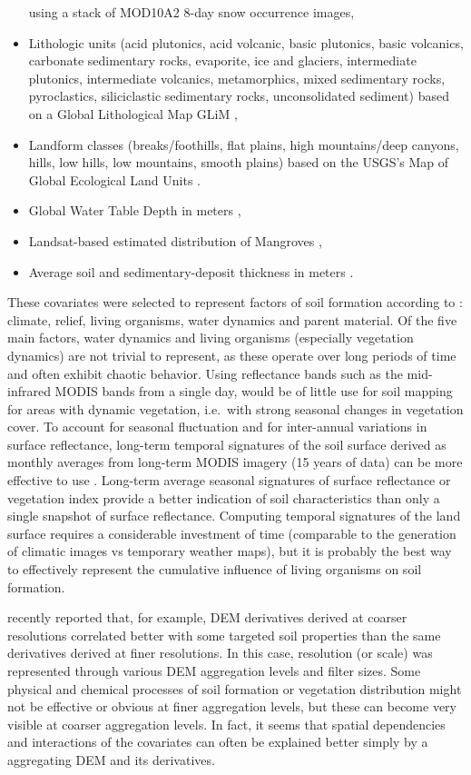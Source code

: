 \documentclass[graybox,natbib,nospthms,UStrade]{svmono}
\begin{document}
\begin{itemize}
  using a stack of MOD10A2 8-day snow occurrence images,
\item
  Lithologic units (acid plutonics, acid volcanic, basic plutonics,
  basic volcanics, carbonate sedimentary rocks, evaporite, ice and
  glaciers, intermediate plutonics, intermediate volcanics,
  metamorphics, mixed sedimentary rocks, pyroclastics, siliciclastic
  sedimentary rocks, unconsolidated sediment) based on a Global
  Lithological Map GLiM \citep{GGGE:GGGE2352},
\item
  Landform classes (breaks/foothills, flat plains, high mountains/deep
  canyons, hills, low hills, low mountains, smooth plains) based on
  the USGS's Map of Global Ecological Land Units \citep{sayre2014new}.
\item
  Global Water Table Depth in meters \citep{fan2013global},
\item
  Landsat-based estimated distribution of Mangroves \citep{giri2011status},
\item
  Average soil and sedimentary-deposit thickness in meters \citep{Pelletier2016}.
\end{itemize}

These covariates were selected to represent factors of soil formation
according to \citet{jenny1994factors}: climate, relief, living organisms,
water dynamics and parent material. Of the five main factors, water
dynamics and living organisms (especially vegetation dynamics) are not
trivial to represent, as these operate over long periods of time and
often exhibit chaotic behavior. Using reflectance bands such as the
mid-infrared MODIS bands from a single day, would be of little use for
soil mapping for areas with dynamic vegetation, i.e.~with strong
seasonal changes in vegetation cover. To account for seasonal
fluctuation and for inter-annual variations in surface reflectance,
long-term temporal signatures of the soil surface derived
as monthly averages from long-term MODIS imagery (15 years of data)
can be more effective to use \citep{Hengl2017SoilGrids250m}.
Long-term average seasonal signatures of surface reflectance or vegetation
index provide a better indication of soil characteristics than only a single snapshot of
surface reflectance. Computing temporal signatures of the land surface
requires a considerable investment of time (comparable to the generation
of climatic images vs temporary weather maps), but it is probably the
best way to effectively represent the cumulative influence of living organisms on
soil formation.

\citet{Behrens2018128} recently reported that, for example, DEM
derivatives derived at coarser resolutions correlated better with some
targeted soil properties than the same derivatives derived at finer resolutions. In
this case, resolution (or scale) was represented through various DEM aggregation levels
and filter sizes. Some physical and chemical processes of soil formation
or vegetation distribution might not be effective or obvious at finer aggregation
levels, but these can become very visible at coarser aggregation levels. In
fact, it seems that spatial dependencies and interactions of the
covariates can often be explained better simply by a aggregating DEM and its
derivatives.
\end{document}
